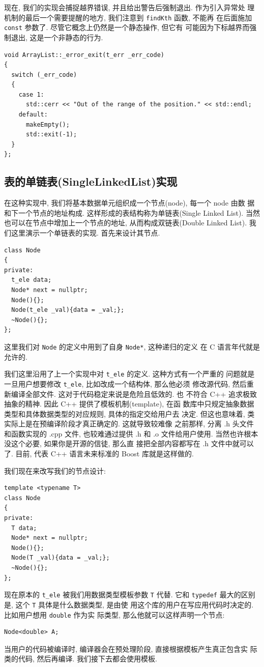 \documentclass[a4paper]{ctexart}
\theoremstyle{definition}
\theoremstyle{definition}
\begin{document}
现在, 我们的实现会捕捉越界错误, 并且给出警告后强制退出. 作为引入异常处
理机制的最后一个需要提醒的地方, 我们注意到 \verb|findKth| 函数, 不能再
在后面施加 \verb|const| 参数了. 尽管它概念上仍然是一个静态操作, 但它有
可能因为下标越界而强制退出, 这是一个非静态的行为. 
\begin{verbatim}
void ArrayList::_error_exit(t_err _err_code)
{
  switch (_err_code)
  {
    case 1:
      std::cerr << "Out of the range of the position." << std::endl;
    default:
      makeEmpty();
      std::exit(-1);
  }
};
\end{verbatim}

\subsection{表的单链表(SingleLinkedList)实现}
在这种实现中, 我们将基本数据单元组织成一个节点(node), 每一个 node 由数
据和下一个节点的地址构成. 这样形成的表结构称为单链表(Single Linked
List). 当然也可以在节点中增加上一个节点的地址, 从而构成双链表(Double
Linked List). 我们这里演示一个单链表的实现. 首先来设计其节点.

\begin{verbatim}
class Node
{
private:
  t_ele data;
  Node* next = nullptr; 
  Node(){};
  Node(t_ele _val){data = _val;};
  ~Node(){};
};
\end{verbatim}
这里我们对 \verb|Node| 的定义中用到了自身 \verb|Node*|, 这种递归的定义
在 C 语言年代就是允许的.

我们这里沿用了上一个实现中对 \verb|t_ele| 的定义. 这种方式有一个严重的
问题就是一旦用户想要修改 \verb|t_ele|, 比如改成一个结构体, 那么他必须
修改源代码, 然后重新编译全部文件. 这对于代码稳定来说是危险且低效的. 也
不符合 C++ 追求极致抽象的精神. 因此 C++ 提供了模板机制(template), 在函
数库中只规定抽象数据类型和具体数据类型的对应规则, 具体的指定交给用户去
决定. 但这也意味着, 类实际上是在预编译阶段才真正确定的. 这就导致较难像
之前那样, 分离 .h 头文件和函数实现的 .cpp 文件, 也较难通过提供 .h 和
.o 文件给用户使用. 当然也许根本没这个必要, 如果你是开源的信徒, 那么直
接把全部内容都写在 .h 文件中就可以了. 目前, 代表 C++ 语言未来标准的
Boost 库就是这样做的.

我们现在来改写我们的节点设计:
\begin{verbatim}
template <typename T>
class Node
{
private:
  T data;
  Node* next = nullptr; 
  Node(){};
  Node(T _val){data = _val;};
  ~Node(){};
};
\end{verbatim}
现在原本的 \verb|t_ele| 被我们用数据类型模板参数 \verb|T| 代替. 它和
\verb|typedef| 最大的区别是, 这个 \verb|T| 具体是什么数据类型, 是由使
用这个库的用户在写应用代码时决定的. 比如用户想用 \verb|double| 作为实
际类型, 那么他就可以这样声明一个节点:
\begin{verbatim}
Node<double> A;
\end{verbatim}
当用户的代码被编译时, 编译器会在预处理阶段, 直接根据模板产生真正包含实
际类的代码, 然后再编译. 我们接下去都会使用模板.
\end{document}
